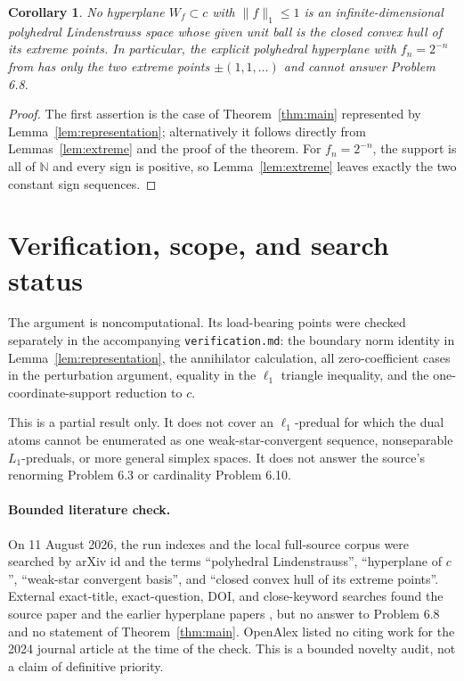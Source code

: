 \documentclass[11pt]{article}
\newtheorem{corollary}[theorem]{Corollary}
\begin{document}
\begin{corollary}
No hyperplane $W_f\subset c$ with $\|f\|_1\le1$ is an
infinite-dimensional polyhedral Lindenstrauss space whose given unit ball is
the closed convex hull of its extreme points. In particular, the explicit
polyhedral hyperplane with $f_n=2^{-n}$ from \cite{CMP} has only the two
extreme points $\pm(1,1,\ldots)$ and cannot answer Problem 6.8.
\end{corollary}

\begin{proof}
The first assertion is the case of Theorem~\ref{thm:main} represented by
Lemma~\ref{lem:representation}; alternatively it follows directly from
Lemmas~\ref{lem:extreme} and the proof of the theorem. For $f_n=2^{-n}$,
the support is all of $\mathbb N$ and every sign is positive, so
Lemma~\ref{lem:extreme} leaves exactly the two constant sign sequences.
\end{proof}

\section{Verification, scope, and search status}

The argument is noncomputational. Its load-bearing points were checked
separately in the accompanying \texttt{verification.md}: the boundary norm
identity in Lemma~\ref{lem:representation}, the annihilator calculation, all
zero-coefficient cases in the perturbation argument, equality in the
$\ell_1$ triangle inequality, and the one-coordinate-support reduction to
$c$.

This is a partial result only. It does not cover an $\ell_1$-predual for
which the dual atoms cannot be enumerated as one weak-star-convergent
sequence, nonseparable $L_1$-preduals, or more general simplex spaces. It
does not answer the source's renorming Problem 6.3 or cardinality Problem
6.10.

\paragraph{Bounded literature check.}
On 11 August 2026, the run indexes and the local full-source corpus were
searched by arXiv id and the terms ``polyhedral Lindenstrauss'', ``hyperplane
of $c$'', ``weak-star convergent basis'', and ``closed convex hull of its
extreme points''. External exact-title, exact-question, DOI, and close-keyword
searches found the source paper and the earlier hyperplane papers
\cite{CMP,CMPV}, but no answer to Problem 6.8 and no statement of
Theorem~\ref{thm:main}. OpenAlex listed no citing work for the 2024 journal
article at the time of the check. This is a bounded novelty audit, not a
claim of definitive priority.
\end{document}
